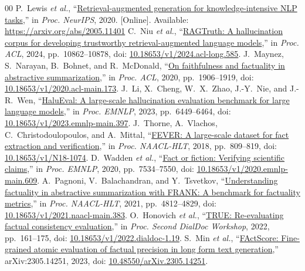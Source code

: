 \documentclass[conference,a4paper]{IEEEtran}
\begin{document}
\begin{thebibliography}{00}
 P.~Lewis \emph{et al.}, ``\href{https://arxiv.org/abs/2005.11401}{Retrieval-augmented generation for knowledge-intensive NLP tasks},'' in \emph{Proc. NeurIPS}, 2020. [Online]. Available: \url{https://arxiv.org/abs/2005.11401}
 C.~Niu \emph{et al.}, ``\href{https://aclanthology.org/2024.acl-long.585/}{RAGTruth: A hallucination corpus for developing trustworthy retrieval-augmented language models},'' in \emph{Proc. ACL}, 2024, pp.~10862--10878, doi: \href{https://doi.org/10.18653/v1/2024.acl-long.585}{10.18653/v1/2024.acl-long.585}.
 J.~Maynez, S.~Narayan, B.~Bohnet, and R.~McDonald, ``\href{https://aclanthology.org/2020.acl-main.173/}{On faithfulness and factuality in abstractive summarization},'' in \emph{Proc. ACL}, 2020, pp.~1906--1919, doi: \href{https://doi.org/10.18653/v1/2020.acl-main.173}{10.18653/v1/2020.acl-main.173}.
 J.~Li, X.~Cheng, W.~X.~Zhao, J.-Y.~Nie, and J.-R.~Wen, ``\href{https://aclanthology.org/2023.emnlp-main.397/}{HaluEval: A large-scale hallucination evaluation benchmark for large language models},'' in \emph{Proc. EMNLP}, 2023, pp.~6449--6464, doi: \href{https://doi.org/10.18653/v1/2023.emnlp-main.397}{10.18653/v1/2023.emnlp-main.397}.
 J.~Thorne, A.~Vlachos, C.~Christodoulopoulos, and A.~Mittal, ``\href{https://aclanthology.org/N18-1074/}{FEVER: A large-scale dataset for fact extraction and verification},'' in \emph{Proc. NAACL-HLT}, 2018, pp.~809--819, doi: \href{https://doi.org/10.18653/v1/N18-1074}{10.18653/v1/N18-1074}.
 D.~Wadden \emph{et al.}, ``\href{https://aclanthology.org/2020.emnlp-main.609/}{Fact or fiction: Verifying scientific claims},'' in \emph{Proc. EMNLP}, 2020, pp.~7534--7550, doi: \href{https://doi.org/10.18653/v1/2020.emnlp-main.609}{10.18653/v1/2020.emnlp-main.609}.
 A.~Pagnoni, V.~Balachandran, and Y.~Tsvetkov, ``\href{https://aclanthology.org/2021.naacl-main.383/}{Understanding factuality in abstractive summarization with FRANK: A benchmark for factuality metrics},'' in \emph{Proc. NAACL-HLT}, 2021, pp.~4812--4829, doi: \href{https://doi.org/10.18653/v1/2021.naacl-main.383}{10.18653/v1/2021.naacl-main.383}.
 O.~Honovich \emph{et al.}, ``\href{https://aclanthology.org/2022.dialdoc-1.19/}{TRUE: Re-evaluating factual consistency evaluation},'' in \emph{Proc. Second DialDoc Workshop}, 2022, pp.~161--175, doi: \href{https://doi.org/10.18653/v1/2022.dialdoc-1.19}{10.18653/v1/2022.dialdoc-1.19}.
 S.~Min \emph{et al.}, ``\href{https://arxiv.org/abs/2305.14251}{FActScore: Fine-grained atomic evaluation of factual precision in long form text generation},'' arXiv:2305.14251, 2023, doi: \href{https://doi.org/10.48550/arXiv.2305.14251}{10.48550/arXiv.2305.14251}.

\end{thebibliography}
\end{document}
